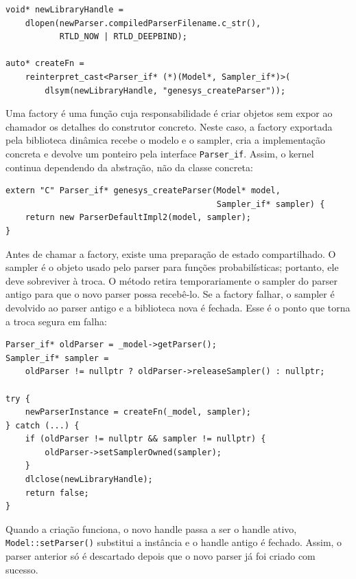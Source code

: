 \documentclass[12pt,a4paper]{article}
\begin{document}
\begin{lstlisting}[style=cppsmall]
void* newLibraryHandle =
    dlopen(newParser.compiledParserFilename.c_str(),
           RTLD_NOW | RTLD_DEEPBIND);

auto* createFn =
    reinterpret_cast<Parser_if* (*)(Model*, Sampler_if*)>(
        dlsym(newLibraryHandle, "genesys_createParser"));
\end{lstlisting}

Uma factory \'e uma fun\c{c}\~ao cuja responsabilidade \'e criar objetos sem expor ao chamador os detalhes do construtor concreto. Neste caso, a factory exportada pela biblioteca din\^amica recebe o modelo e o sampler, cria a implementa\c{c}\~ao concreta e devolve um ponteiro pela interface \texttt{Parser\_if}. Assim, o kernel continua dependendo da abstra\c{c}\~ao, n\~ao da classe concreta:

\begin{lstlisting}[style=cppsmall]
extern "C" Parser_if* genesys_createParser(Model* model,
                                           Sampler_if* sampler) {
    return new ParserDefaultImpl2(model, sampler);
}
\end{lstlisting}

Antes de chamar a factory, existe uma prepara\c{c}\~ao de estado compartilhado. O sampler \'e o objeto usado pelo parser para fun\c{c}\~oes probabil\'isticas; portanto, ele deve sobreviver \`a troca. O m\'etodo retira temporariamente o sampler do parser antigo para que o novo parser possa receb\^e-lo. Se a factory falhar, o sampler \'e devolvido ao parser antigo e a biblioteca nova \'e fechada. Esse \'e o ponto que torna a troca segura em falha:

\begin{lstlisting}[style=cppsmall]
Parser_if* oldParser = _model->getParser();
Sampler_if* sampler =
    oldParser != nullptr ? oldParser->releaseSampler() : nullptr;

try {
    newParserInstance = createFn(_model, sampler);
} catch (...) {
    if (oldParser != nullptr && sampler != nullptr) {
        oldParser->setSamplerOwned(sampler);
    }
    dlclose(newLibraryHandle);
    return false;
}
\end{lstlisting}

Quando a cria\c{c}\~ao funciona, o novo handle passa a ser o handle ativo, \texttt{Model::setParser()} substitui a inst\^ancia e o handle antigo \'e fechado. Assim, o parser anterior s\'o \'e descartado depois que o novo parser j\'a foi criado com sucesso.
\end{document}
